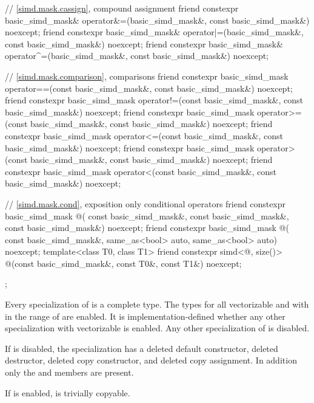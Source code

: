 \begin{codeblock}
{  // \ref{simd.mask.cassign},  compound assignment
  friend constexpr basic_simd_mask&
    operator&=(basic_simd_mask&, const basic_simd_mask&) noexcept;
  friend constexpr basic_simd_mask&
    operator|=(basic_simd_mask&, const basic_simd_mask&) noexcept;
  friend constexpr basic_simd_mask&
    operator^=(basic_simd_mask&, const basic_simd_mask&) noexcept;

  // \ref{simd.mask.comparison},  comparisons
  friend constexpr basic_simd_mask
    operator==(const basic_simd_mask&, const basic_simd_mask&) noexcept;
  friend constexpr basic_simd_mask
    operator!=(const basic_simd_mask&, const basic_simd_mask&) noexcept;
  friend constexpr basic_simd_mask
    operator>=(const basic_simd_mask&, const basic_simd_mask&) noexcept;
  friend constexpr basic_simd_mask
    operator<=(const basic_simd_mask&, const basic_simd_mask&) noexcept;
  friend constexpr basic_simd_mask
    operator>(const basic_simd_mask&, const basic_simd_mask&) noexcept;
  friend constexpr basic_simd_mask
    operator<(const basic_simd_mask&, const basic_simd_mask&) noexcept;

  // \ref{simd.mask.cond},  exposition only conditional operators
  friend constexpr basic_simd_mask @\simdselect@(
    const basic_simd_mask&, const basic_simd_mask&, const basic_simd_mask&) noexcept;
  friend constexpr basic_simd_mask @\simdselect@(
    const basic_simd_mask&, same_as<bool> auto, same_as<bool> auto) noexcept;
  template<class T0, class T1>
    friend constexpr simd<@\seebelow@, size()>
      @\simdselect@(const basic_simd_mask&, const T0&, const T1&) noexcept;
};
\end{codeblock}

\pnum
Every specialization of  is a complete type.
The types  for all vectorizable
 and with  in the range of  are enabled.
It is implementation-defined whether any other 
specialization with vectorizable  is enabled.
Any other specialization of  is disabled.

If  is disabled, the specialization has a deleted
default constructor, deleted destructor, deleted copy constructor, and deleted copy assignment.
In addition only the  and  members are present.

If  is enabled,  is
trivially copyable.

